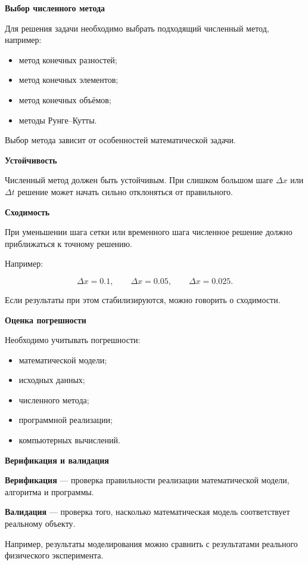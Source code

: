 \textbf{Выбор численного метода}

Для решения задачи необходимо выбрать подходящий численный метод, например:

\begin{itemize}
	\item метод конечных разностей;
	\item метод конечных элементов;
	\item метод конечных объёмов;
	\item методы Рунге--Кутты.
\end{itemize}

Выбор метода зависит от особенностей математической задачи.

\textbf{Устойчивость}

Численный метод должен быть устойчивым. При слишком большом шаге
$\Delta x$ или $\Delta t$ решение может начать сильно отклоняться
от правильного.

\textbf{Сходимость}

При уменьшении шага сетки или временного шага численное решение
должно приближаться к точному решению.

Например:

\[
\Delta x=0.1,\qquad
\Delta x=0.05,\qquad
\Delta x=0.025.
\]

Если результаты при этом стабилизируются, можно говорить о сходимости.

\textbf{Оценка погрешности}

Необходимо учитывать погрешности:

\begin{itemize}
	\item математической модели;
	\item исходных данных;
	\item численного метода;
	\item программной реализации;
	\item компьютерных вычислений.
\end{itemize}

\textbf{Верификация и валидация}

\textbf{Верификация} --- проверка правильности реализации
математической модели, алгоритма и программы.

\textbf{Валидация} --- проверка того, насколько математическая модель
соответствует реальному объекту.

Например, результаты моделирования можно сравнить с результатами
реального физического эксперимента.

\newpage